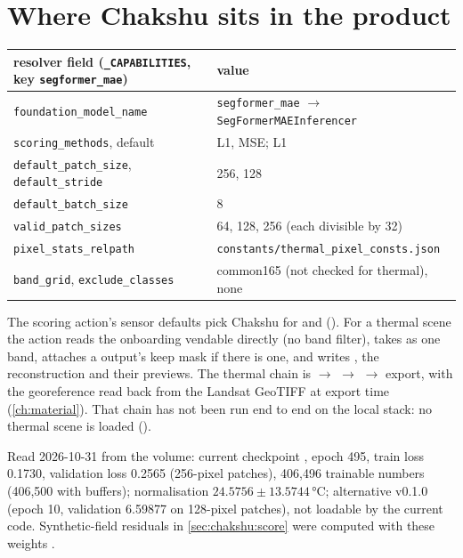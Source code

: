 \section{Where Chakshu sits in the product}\label{sec:chakshu:product}

\begin{center}\small
\begin{tabular}{@{}ll@{}}
\toprule
resolver field (\texttt{\_CAPABILITIES}, key \texttt{segformer\_mae}) & value\\
\midrule
\texttt{foundation\_model\_name} & \texttt{segformer\_mae} $\to$ \texttt{SegFormerMAEInferencer}\\
\texttt{scoring\_methods}, default & L1, MSE; L1\\
\texttt{default\_patch\_size}, \texttt{default\_stride} & 256, 128\\
\texttt{default\_batch\_size} & 8\\
\texttt{valid\_patch\_sizes} & 64, 128, 256 (each divisible by 32)\\
\texttt{pixel\_stats\_relpath} & \texttt{constants/thermal\_pixel\_consts.json}\\
\texttt{band\_grid}, \texttt{exclude\_classes} & common165 (not checked for thermal), none\\
\bottomrule
\end{tabular}
\end{center}
\begin{sloppypar}\noindent The scoring action's sensor defaults pick Chakshu for  and 
(). For a thermal scene the action reads the onboarding
vendable directly (no band filter), takes  as one band, attaches a 
output's keep mask if there is one, and writes , the reconstruction and their
previews. The thermal chain is  $\to$  $\to$  $\to$
export, with the georeference read back from the Landsat GeoTIFF at export time (\cref{ch:material}). That chain
has not been run end to end on the local stack: no thermal scene is loaded
().\end{sloppypar}

\begin{drift}
Read 2026-10-31 from the  volume: current checkpoint ,
epoch 495, train loss 0.1730, validation loss 0.2565 (256-pixel patches), 406,496 trainable numbers (406,500 with
buffers); normalisation $24.5756\pm13.5744$\,°C; alternative v0.1.0 (epoch 10, validation 6.59877 on 128-pixel patches),
not loadable by the current code. Synthetic-field residuals in \cref{sec:chakshu:score} were computed with these
weights \tagC.
\end{drift}

